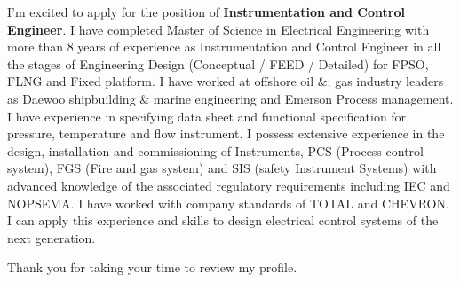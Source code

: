 \documentclass[11pt, a4paper]{ishan-cl} %
\newcommand{\positionname}{\textbf{Instrumentation and Control Engineer}}%
\begin{document}
	
	\makecvheader %
	\makelettertitle %
	
	
	\begin{cvletter}
		
		I’m excited to apply for the position of \textbf{\positionname}. %
		I have completed Master of Science in Electrical Engineering with more than 8
		years of experience as Instrumentation and Control Engineer in all the stages of Engineering
		Design (Conceptual / FEED / Detailed) for FPSO, FLNG and Fixed platform. I have worked at
		offshore oil \&; gas industry leaders as Daewoo shipbuilding \& marine engineering and
		Emerson Process management. I have experience in specifying data sheet and functional specification for pressure, temperature and flow instrument. I possess extensive experience in the design, installation and
		commissioning of Instruments, PCS (Process control system), FGS (Fire and gas system) and
		SIS (safety Instrument Systems) with advanced knowledge of the associated regulatory
		requirements including IEC and NOPSEMA. I have worked with company standards of TOTAL
		and CHEVRON. I can apply this experience and skills to design electrical control systems of the
		next generation. 
		
		
		Thank you for taking your time to review my profile.
		\\
	\end{cvletter}
	
	\makeletterclosing %
\end{document}
